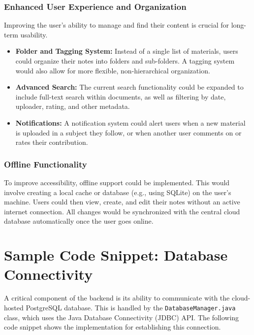 \documentclass[12pt, a4paper]{report}
\begin{document}
\begin{itemize}
\subsection{Enhanced User Experience and Organization}
Improving the user's ability to manage and find their content is crucial for long-term usability.
\begin{itemize}
    \item \textbf{Folder and Tagging System:} Instead of a single list of materials, users could organize their notes into folders and sub-folders. A tagging system would also allow for more flexible, non-hierarchical organization.
    \item \textbf{Advanced Search:} The current search functionality could be expanded to include full-text search within documents, as well as filtering by date, uploader, rating, and other metadata.
    \item \textbf{Notifications:} A notification system could alert users when a new material is uploaded in a subject they follow, or when another user comments on or rates their contribution.
\end{itemize}

\subsection{Offline Functionality}
To improve accessibility, offline support could be implemented. This would involve creating a local cache or database (e.g., using SQLite) on the user's machine. Users could then view, create, and edit their notes without an active internet connection. All changes would be synchronized with the central cloud database automatically once the user goes online.
\appendix
\chapter{Sample Code Snippet: Database Connectivity}

A critical component of the backend is its ability to communicate with the cloud-hosted PostgreSQL database. This is handled by the \texttt{DatabaseManager.java} class, which uses the Java Database Connectivity (JDBC) API. The following code snippet shows the implementation for establishing this connection.


\end{itemize}
\end{document}

